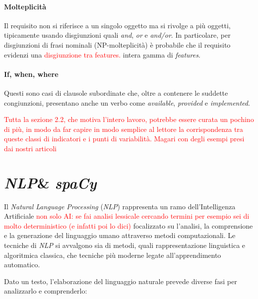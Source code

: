 \documentclass[12pt]{report}
\newcommand{\torevise}[1]{\textcolor{red}{#1}}
\newcommand{\spacy}{\textsl{spaCy}\xspace}
\newcommand{\nlp}{\textsl{NLP}\xspace}
\begin{document}
\subsubsection{Molteplicità}
Il requisito non si riferisce a un singolo oggetto ma si rivolge a più oggetti, tipicamente usando disgiunzioni quali \textit{and}, \textit{or} e \textit{and/or}. In particolare, per disgiunzioni di frasi nominali (NP-molteplicità) è probabile che il requisito evidenzi una \torevise{disgiunzione tra features.} intera gamma di \textit{features}.


\subsubsection{If, when, where}
Questi sono casi di clausole subordinate che, oltre a contenere le suddette congiunzioni, presentano anche un verbo come \textit{available}, \textit{provided} e \textit{implemented}.



\torevise{Tutta la sezione 2.2, che motiva l'intero lavoro, potrebbe essere curata un pochino di più, in modo da far capire in modo semplice al lettore la corrispondenza tra queste classi di indicatori e i punti di variabilità. Magari con degli esempi presi dai nostri articoli}




\chapter{\nlp \& \spacy}
\label{ch:nlp}
Il \textit{Natural Language Processing} (\nlp) rappresenta un ramo dell'Intelligenza Artificiale \torevise{non solo AI: se fai analisi lessicale cercando termini per esempio sei di molto deterministico (e infatti poi lo dici)} focalizzato su l'analisi, la comprensione e la generazione del linguaggio umano attraverso metodi computazionali. Le tecniche di \nlp si avvalgono sia di metodi, quali rappresentazione linguistica e algoritmica classica, che tecniche più moderne legate all'apprendimento automatico.

Dato un testo, l'elaborazione del linguaggio naturale prevede diverse fasi per analizzarlo e comprenderlo:
\end{document}
